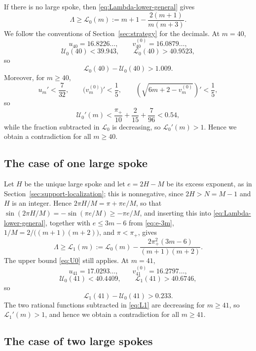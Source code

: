 \documentclass[11pt]{article}
\theoremstyle{definition}
\theoremstyle{remark}
\numberwithin{equation}{section}
\begin{document}
If there is no large spoke, then \eqref{eq:Lambda-lower-general} gives
\[
  \Lambda\ge\mathcal L_0(m):=
  m+1-\frac{2(m+1)}{m(m+3)}.
\]
We follow the conventions of Section~\ref{sec:strategy} for the decimals. At $m=40$,
\[
  u_{40}=16.8226\ldots,
  \qquad
  v_{40}^{(0)}=16.0879\ldots,
\]
\[
  \mathcal U_0(40)<39.943,
  \qquad
  \mathcal L_0(40)>40.9523,
\]
so
\[
  \mathcal L_0(40)-\mathcal U_0(40)>1.009.
\]
Moreover, for $m\ge40$,
\[
  u_m'<\frac7{32},
  \qquad
  \bigl(v_m^{(0)}\bigr)'<\frac15,
  \qquad
  \left(\sqrt{6m+2-v_m^{(0)}}\right)'<\frac15,
\]
so
\[
  \mathcal U_0'(m)<\frac{\pi_+}{10}+\frac2{15}+\frac7{96}<0.54,
\]
while the fraction subtracted in $\mathcal L_0$ is decreasing, so $\mathcal L_0'(m)>1$. Hence we obtain a contradiction for all $m\ge40$.

\subsection{The case of one large spoke}\label{ssec:h1}

Let $H$ be the unique large spoke and let $e=2H-M$ be its excess exponent, as in Section~\ref{sec:support-localization};
this is nonnegative, since $2H>N=M-1$ and $H$ is an integer. Hence
$2\pi H/M=\pi+\pi e/M$, so that
$\sin(2\pi H/M)=-\sin(\pi e/M)\ge-\pi e/M$, and inserting this into
\eqref{eq:Lambda-lower-general}, together with $e\le3m-6$ from
\eqref{eq:e-3m}, $1/M=2/\bigl((m+1)(m+2)\bigr)$, and $\pi<\pi_+$, gives
\begin{equation}\label{eq:L1}
  \Lambda\ge\mathcal L_1(m):=
  \mathcal L_0(m)-
  \frac{2\pi_+^2(3m-6)}{(m+1)(m+2)}.
\end{equation}
The upper bound \eqref{eq:U0} still applies. At $m=41$,
\[
  u_{41}=17.0293\ldots,
  \qquad
  v_{41}^{(0)}=16.2797\ldots,
\]
\[
  \mathcal U_0(41)<40.4409,
  \qquad
  \mathcal L_1(41)>40.6746,
\]
so
\[
  \mathcal L_1(41)-\mathcal U_0(41)>0.233.
\]
The two rational functions subtracted in \eqref{eq:L1} are decreasing for $m\ge41$, so $\mathcal L_1'(m)>1$, and hence we obtain a contradiction for all $m\ge41$.

\subsection{The case of two large spokes}\label{ssec:h2}
\end{document}

